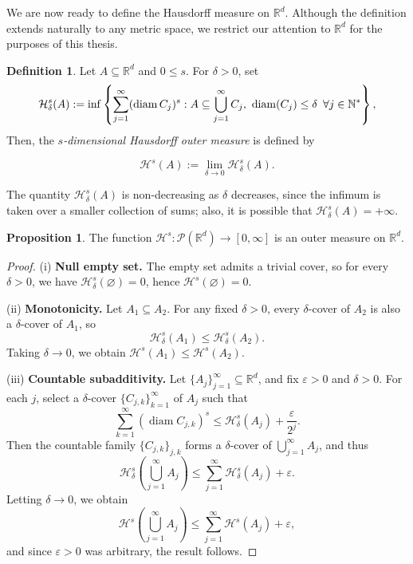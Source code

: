 \documentclass[12pt,a4paper]{report}
\theoremstyle{definition}
\newtheorem{proposition}{Proposition}
\newtheorem{definition}{Definition}
\begin{document}
We are now ready to define the Hausdorff measure on \( \mathbb{R}^d \). Although the definition extends naturally to any metric space, we restrict our attention to \( \mathbb{R}^d \) for the purposes of this thesis.
\begin{definition}
Let \( A \subseteq \mathbb{R}^d \) and $0\leq s$. For \( \delta > 0 \), set
$$
\mathcal{H}^s_\delta(A) := \inf \left\{ \sum_{j=1}^\infty (\operatorname{diam} C_j)^s : A \subseteq \bigcup_{j=1}^\infty C_j,\ \operatorname{diam}(C_j) \le \delta \hspace{0.5em} \forall j \in \mathbb{N^*} \right\},
$$
Then, the \textit{$s$-dimensional Hausdorff outer measure} is defined by

$$\mathcal{H}^s(A) := \lim_{\delta \to 0} \mathcal{H}^s_\delta(A).$$
\end{definition}

The quantity $\mathcal{H}^s_\delta(A)$ is non-decreasing as $\delta$ decreases, since the infimum is taken over a smaller collection of sums; also, it is possible that $\mathcal{H}^s_\delta(A) = +\infty$.

\begin{proposition}
The function \( \mathcal{H}^s : \mathcal{P}(\mathbb{R}^d) \to [0,\infty] \) is an outer measure on \( \mathbb{R}^d \).
\end{proposition}

\begin{proof}
(i) \textbf{Null empty set.} The empty set admits a trivial cover, so for every \( \delta > 0 \), we have \( \mathcal{H}^s_\delta(\varnothing) = 0 \), hence \( \mathcal{H}^s(\varnothing) = 0 \).

\vspace{1ex}
\noindent
(ii) \textbf{Monotonicity.} Let \( A_1 \subseteq A_2 \). For any fixed \( \delta > 0 \), every \( \delta \)-cover of \( A_2 \) is also a \( \delta \)-cover of \( A_1 \), so
\[
\mathcal{H}^s_\delta(A_1) \le \mathcal{H}^s_\delta(A_2).
\]
Taking \( \delta \to 0 \), we obtain \( \mathcal{H}^s(A_1) \le \mathcal{H}^s(A_2) \).

\vspace{1ex}
\noindent
(iii) \textbf{Countable subadditivity.} Let \( \{A_j\}_{j=1}^\infty \subseteq \mathbb{R}^d \), and fix \( \varepsilon > 0 \) and \( \delta > 0 \). For each \( j \), select a \( \delta \)-cover \( \{C_{j,k}\}_{k=1}^\infty \) of \( A_j \) such that
\[
\sum_{k=1}^\infty (\operatorname{diam} C_{j,k})^s \le \mathcal{H}^s_\delta(A_j) + \frac{\varepsilon}{2^j}.
\]
Then the countable family \( \{C_{j,k}\}_{j,k} \) forms a \( \delta \)-cover of \( \bigcup_{j=1}^\infty A_j \), and thus
\[
\mathcal{H}^s_\delta\left( \bigcup_{j=1}^\infty A_j \right) \le \sum_{j=1}^\infty \mathcal{H}^s_\delta(A_j) + \varepsilon.
\]
Letting \( \delta \to 0 \), we obtain
\[
\mathcal{H}^s\left( \bigcup_{j=1}^\infty A_j \right) \le \sum_{j=1}^\infty \mathcal{H}^s(A_j) + \varepsilon,
\]
and since \( \varepsilon > 0 \) was arbitrary, the result follows.
\end{proof}
\end{document}

